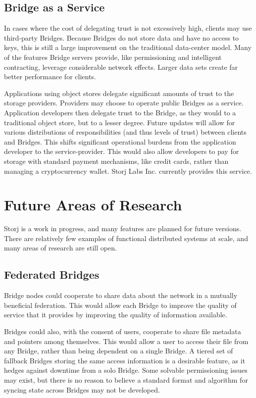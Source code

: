 \documentclass[a4paper,10pt]{article}
\begin{document}
\subsection{Bridge as a Service}
In cases where the cost of delegating trust is not excessively high, clients may use third-party Bridges. Because Bridges do not store data and have no access to keys, this is still a large improvement on the traditional data-center model. Many of the features Bridge servers provide, like permissioning and intelligent contracting, leverage considerable network effects. Larger data sets create far better performance for clients.

Applications using object stores delegate significant amounts of trust to the storage providers. Providers may choose to operate public Bridges as a service. Application developers then delegate trust to the Bridge, as they would to a traditional object store, but to a lesser degree. Future updates will allow for various distributions of responsibilities (and thus levels of trust) between clients and Bridges. This shifts significant operational burdens from the application developer to the service-provider. This would also allow developers to pay for storage with standard payment mechanisms, like credit cards, rather than managing a cryptocurrency wallet. Storj Labs Inc. currently provides this service.


\section{Future Areas of Research}
Storj is a work in progress, and many features are planned for future versions. There are relatively few examples of functional distributed systems at scale, and many areas of research are still open.

\subsection{Federated Bridges}
Bridge nodes could cooperate to share data about the network in a mutually beneficial federation. This would allow each Bridge to improve the quality of service that it provides by improving the quality of information available.

Bridges could also, with the consent of users, cooperate to share file metadata and pointers among themselves. This would allow a user to access their file from any Bridge, rather than being dependent on a single Bridge. A tiered set of fallback Bridges storing the same access information is a desirable feature, as it hedges against downtime from a solo Bridge. Some solvable permissioning issues may exist, but there is no reason to believe a standard format and algorithm for syncing state across Bridges may not be developed.
\end{document}
